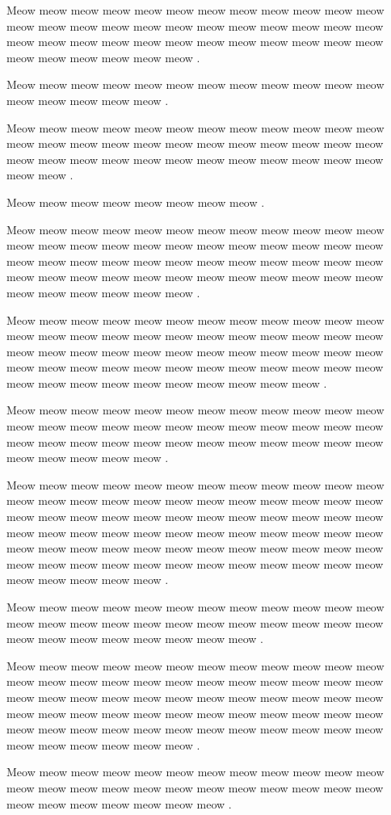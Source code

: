 \documentclass[12pt, a5paper, openany]{book}
\begin{document}
Meow meow meow meow meow meow meow meow meow meow meow meow meow meow meow meow meow meow meow meow meow meow meow meow meow meow meow meow meow meow meow meow meow meow meow meow meow meow meow meow meow meow .

Meow meow meow meow meow meow meow meow meow meow meow meow meow meow meow meow meow .

Meow meow meow meow meow meow meow meow meow meow meow meow meow meow meow meow meow meow meow meow meow meow meow meow meow meow meow meow meow meow meow meow meow meow meow meow meow meow .

Meow meow meow meow meow meow meow meow .

Meow meow meow meow meow meow meow meow meow meow meow meow meow meow meow meow meow meow meow meow meow meow meow meow meow meow meow meow meow meow meow meow meow meow meow meow meow meow meow meow meow meow meow meow meow meow meow meow meow meow meow meow meow meow .

Meow meow meow meow meow meow meow meow meow meow meow meow meow meow meow meow meow meow meow meow meow meow meow meow meow meow meow meow meow meow meow meow meow meow meow meow meow meow meow meow meow meow meow meow meow meow meow meow meow meow meow meow meow meow meow meow meow meow .

Meow meow meow meow meow meow meow meow meow meow meow meow meow meow meow meow meow meow meow meow meow meow meow meow meow meow meow meow meow meow meow meow meow meow meow meow meow meow meow meow meow .

Meow meow meow meow meow meow meow meow meow meow meow meow meow meow meow meow meow meow meow meow meow meow meow meow meow meow meow meow meow meow meow meow meow meow meow meow meow meow meow meow meow meow meow meow meow meow meow meow meow meow meow meow meow meow meow meow meow meow meow meow meow meow meow meow meow meow meow meow meow meow meow meow meow meow meow meow meow .

Meow meow meow meow meow meow meow meow meow meow meow meow meow meow meow meow meow meow meow meow meow meow meow meow meow meow meow meow meow meow meow meow .

Meow meow meow meow meow meow meow meow meow meow meow meow meow meow meow meow meow meow meow meow meow meow meow meow meow meow meow meow meow meow meow meow meow meow meow meow meow meow meow meow meow meow meow meow meow meow meow meow meow meow meow meow meow meow meow meow meow meow meow meow meow meow meow meow meow meow .

Meow meow meow meow meow meow meow meow meow meow meow meow meow meow meow meow meow meow meow meow meow meow meow meow meow meow meow meow meow meow meow .
\end{document}
